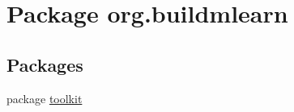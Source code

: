 \hypertarget{namespaceorg_1_1buildmlearn}{}\section{Package org.\+buildmlearn}
\label{namespaceorg_1_1buildmlearn}
\subsection*{Packages}
\begin{DoxyCompactItemize}
\item 
package \hyperlink{namespaceorg_1_1buildmlearn_1_1toolkit}{toolkit}
\end{DoxyCompactItemize}
